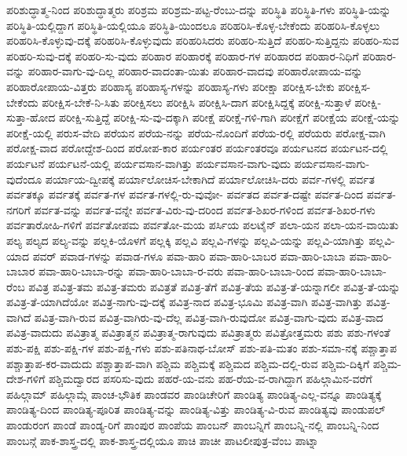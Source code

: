 {ಪರಿಶುದ್ಧಾತ್ಮ-ನಿಂದ
ಪರಿಶುದ್ಧಾತ್ಮರು
ಪರಿಶ್ರಮ
ಪರಿಶ್ರಮ-ಪಟ್ಟ-ರೆಂಬು-ದನ್ನು
ಪರಿಸ್ಥಿತಿ
ಪರಿಸ್ಥಿತಿ-ಗಳು
ಪರಿಸ್ಥಿತಿ-ಯನ್ನು
ಪರಿಸ್ಥಿತಿ-ಯಲ್ಲಿದ್ದಾಗ
ಪರಿಸ್ಥಿತಿ-ಯಲ್ಲಿಯೂ
ಪರಿಸ್ಥಿತಿ-ಯಿಂದಲೂ
ಪರಿಹರಿಸಿ-ಕೊಳ್ಳ-ಬೇಕೆಂದು
ಪರಿಹರಿಸಿ-ಕೊಳ್ಳಲು
ಪರಿಹರಿಸಿ-ಕೊಳ್ಳುವು-ದಕ್ಕೆ
ಪರಿಹರಿಸಿ-ಕೊಳ್ಳುವುದು
ಪರಿಹರಿಸಿದರು
ಪರಿಹರಿ-ಸುತ್ತಿದೆ
ಪರಿಹರಿ-ಸುತ್ತಿದ್ದನು
ಪರಿಹರಿ-ಸುವ
ಪರಿಹರಿ-ಸುವು-ದಕ್ಕೆ
ಪರಿಹರಿ-ಸು-ವುದು
ಪರಿಹಾರ
ಪರಿಹಾರಕ್ಕೆ
ಪರಿಹಾರ-ಗಳ
ಪರಿಹಾರದ
ಪರಿಹಾರ-ನಿಧಿಗೆ
ಪರಿಹಾರ-ವನ್ನು
ಪರಿಹಾರ-ವಾಗು-ವು-ದಿಲ್ಲ
ಪರಿಹಾರ-ವಾದಂತಾ-ಯಿತು
ಪರಿಹಾರ-ವಾದವು
ಪರಿಹಾರೋಪಾಯ-ವನ್ನು
ಪರಿಹಾರೋಪಾಯ-ವಿತ್ತರು
ಪರಿಹಾಸ್ಯ
ಪರಿಹಾಸ್ಯ-ಗಳನ್ನು
ಪರಿಹಾಸ್ಯ-ಗಳು
ಪರೀಕ್ಷಾ
ಪರೀಕ್ಷಿಸ-ಬೇಕು
ಪರೀಕ್ಷಿಸ-ಬೇಕೆಂದು
ಪರೀಕ್ಷಿಸ-ಬೇಕೆ-ನಿ-ಸಿತು
ಪರೀಕ್ಷಿಸಲು
ಪರೀಕ್ಷಿಸಿ
ಪರೀಕ್ಷಿಸಿ-ದಾಗ
ಪರೀಕ್ಷಿಸಿದ್ದಕ್ಕೆ
ಪರೀಕ್ಷಿ-ಸುತ್ತಾಳೆ
ಪರೀಕ್ಷಿ-ಸುತ್ತಾ-ಹೋದ
ಪರೀಕ್ಷಿ-ಸುತ್ತಿದ್ದೆ
ಪರೀಕ್ಷಿ-ಸು-ವು-ದಕ್ಕಾಗಿ
ಪರೀಕ್ಷೆ
ಪರೀಕ್ಷೆ-ಗಳಿ-ಗಾಗಿ
ಪರೀಕ್ಷೆಗೆ
ಪರೀಕ್ಷೆಯ
ಪರೀಕ್ಷೆ-ಯನ್ನು
ಪರೀಕ್ಷೆ-ಯಲ್ಲಿ
ಪರುಸ-ವೇದಿ
ಪರೆಯನ
ಪರೆಯ-ನನ್ನು
ಪರೆಯ-ನೊಂದಿಗೆ
ಪರೆಯ-ರಲ್ಲಿ
ಪರೆಯರು
ಪರೋಕ್ಷ-ವಾಗಿ
ಪರೋಕ್ಷ-ವಾದ
ಪರೋದ್ದೇಶ-ದಿಂದ
ಪರೋಪ-ಕಾರ
ಪರ್ಯಂತರ
ಪರ್ಯಂತರವೂ
ಪರ್ಯಟನದ
ಪರ್ಯಟನ-ದಲ್ಲಿ
ಪರ್ಯಟನೆ
ಪರ್ಯಟನೆ-ಯಲ್ಲಿ
ಪರ್ಯವಸಾನ-ವಾಗಿತ್ತು
ಪರ್ಯವಸಾನ-ವಾಗು-ವುದು
ಪರ್ಯವಸಾನ-ವಾಗು-ವುದೆಂದೂ
ಪರ್ಯಾಯ-ದ್ವೀಪಕ್ಕೆ
ಪರ್ಯಾಲೋಚಿಸ-ಬೇಕಾಗಿದೆ
ಪರ್ಯಾಲೋಚಿಸಿ-ದರು
ಪರ್ವ-ಗಳಲ್ಲಿ
ಪರ್ವತ
ಪರ್ವತಕ್ಕೂ
ಪರ್ವತಕ್ಕೆ
ಪರ್ವತ-ಗಳ
ಪರ್ವತ-ಗಳಲ್ಲಿ-ರು-ವುವೋ-
ಪರ್ವತದ
ಪರ್ವತ-ದಷ್ಟೇ
ಪರ್ವತ-ದಿಂದ
ಪರ್ವತ-ನಗರಿಗೆ
ಪರ್ವತ-ವನ್ನು
ಪರ್ವತ-ವನ್ನೇ
ಪರ್ವತ-ವಿರು-ವು-ದರಿಂದ
ಪರ್ವತ-ಶಿಖರ-ಗಳಿಂದ
ಪರ್ವತ-ಶಿಖರ-ಗಳು
ಪರ್ವತಾರೋಹಿ-ಗಳಿಗೆ
ಪರ್ವತೋಪಮ
ಪರ್ವತೋ-ಮಯ
ಪರ್ಸಿಯ
ಪಲಟೈನ್
ಪಲಾ-ಯನ
ಪಲಾ-ಯನ-ವಾಯಿತು
ಪಲ್ಯ
ಪಲ್ಯದ
ಪಲ್ಯ-ವನ್ನು
ಪಲ್ಲಕಿ-ಯೊಳಗೆ
ಪಲ್ಲಕ್ಕಿ
ಪಲ್ಲವಿ
ಪಲ್ಲವಿ-ಗಳನ್ನು
ಪಲ್ಲವಿ-ಯನ್ನು
ಪಲ್ಲವಿ-ಯಾಗಿತ್ತು
ಪಲ್ಲವಿ-ಯಾದ
ಪವರ್
ಪವಾಡ-ಗಳನ್ನು
ಪವಾಡ-ಗಳೂ
ಪವಾ-ಹಾರಿ
ಪವಾ-ಹಾರಿ-ಬಾಬರ
ಪವಾ-ಹಾರಿ-ಬಾಬಾ
ಪವಾ-ಹಾರಿ-ಬಾಬಾರ
ಪವಾ-ಹಾರಿ-ಬಾಬಾ-ರನ್ನು
ಪವಾ-ಹಾರಿ-ಬಾಬಾ-ರ-ವರು
ಪವಾ-ಹಾರಿ-ಬಾಬಾ-ರಿಂದ
ಪವಾ-ಹಾರಿ-ಬಾಬಾ-ರೆಂಬ
ಪವಿತ್ರ
ಪವಿತ್ರ-ತಮ
ಪವಿತ್ರ-ತಮರು
ಪವಿತ್ರತೆ
ಪವಿತ್ರ-ತೆಗೆ
ಪವಿತ್ರ-ತೆಯ
ಪವಿತ್ರ-ತೆ-ಯನ್ನಾಗಲೀ
ಪವಿತ್ರ-ತೆ-ಯನ್ನು
ಪವಿತ್ರ-ತೆ-ಯಾಗಿದೆಯೋ
ಪವಿತ್ರ-ನಾಗು-ವು-ದಕ್ಕೆ
ಪವಿತ್ರ-ನಾದ
ಪವಿತ್ರ-ಭೂಮಿ
ಪವಿತ್ರ-ವಾಗಿ
ಪವಿತ್ರ-ವಾಗಿತ್ತು
ಪವಿತ್ರ-ವಾಗಿದೆ
ಪವಿತ್ರ-ವಾಗಿ-ರುವ
ಪವಿತ್ರ-ವಾಗಿರು-ವು-ದೆಲ್ಲ
ಪವಿತ್ರ-ವಾಗಿ-ರುವುದೋ
ಪವಿತ್ರ-ವಾಗು-ವುದು
ಪವಿತ್ರ-ವಾದ
ಪವಿತ್ರ-ವಾದುದು
ಪವಿತ್ರಾತ್ಮ
ಪವಿತ್ರಾತ್ಮನ
ಪವಿತ್ರಾತ್ಮ-ರಾಗುವುದು
ಪವಿತ್ರಾತ್ಮರು
ಪವಿತ್ರೋತ್ತಮರು
ಪಶು
ಪಶು-ಗಳಂತೆ
ಪಶು-ಪಕ್ಷಿ
ಪಶು-ಪಕ್ಷಿ-ಗಳ
ಪಶು-ಪಕ್ಷಿ-ಗಳು
ಪಶು-ಪತಿನಾಥ-ಬೋಸ್
ಪಶು-ಪತಿ-ಮತಂ
ಪಶು-ಸಮಾ-ನಕ್ಕೆ
ಪಶ್ಚಾತ್ತಾಪ
ಪಶ್ಚಾತ್ತಾಪ-ಕರ-ವಾದುದು
ಪಶ್ಚಾತ್ತಾಪ-ವಾಗಿ
ಪಶ್ಚಿಮ
ಪಶ್ಚಿಮಕ್ಕೆ
ಪಶ್ಚಿಮದ
ಪಶ್ಚಿಮ-ದಲ್ಲಿ-ರುವ
ಪಶ್ಚಿಮ-ದಿಕ್ಕಿಗೆ
ಪಶ್ಚಿಮ-ದೇಶ-ಗಳಿಗೆ
ಪಶ್ಚಿಮದ್ವಾರದ
ಪಸರಿಸು-ವುದು
ಪಹರೆ-ಯ-ವನು
ಪಹ-ರೆಯ-ವ-ರಾಗಿದ್ದಾಗ
ಪಹಿಲ್ಗಾಮಿನ-ವರೆಗೆ
ಪಹಿಲ್ಗಾಮ್
ಪಹಿಲ್ಗಾಮ್ಗೆ
ಪಾಂಚ-ಭೌತಿಕ
ಪಾಂಡವರ
ಪಾಂಡಿಚೇರಿಗೆ
ಪಾಂಡಿತ್ಯ
ಪಾಂಡಿತ್ಯ-ಎಲ್ಲ-ವನ್ನೂ
ಪಾಂಡಿತ್ಯಕ್ಕೆ
ಪಾಂಡಿತ್ಯ-ದಿಂದ
ಪಾಂಡಿತ್ಯ-ಪೂರಿತ
ಪಾಂಡಿತ್ಯ-ವನ್ನು
ಪಾಂಡಿತ್ಯ-ವಿತ್ತು
ಪಾಂಡಿತ್ಯ-ವಿ-ರುವ
ಪಾಂಡಿತ್ಯವು
ಪಾಂಡುಪಲ್
ಪಾಂಡುರಂಗ
ಪಾಂಡೆ
ಪಾಂಡ್ಯ-ರಿಗೆ
ಪಾಂಪುರ
ಪಾಂಪೆಯ
ಪಾಂಬನ್
ಪಾಂಬನ್ನಿಗೆ
ಪಾಂಬನ್ನಿ-ನಲ್ಲಿ
ಪಾಂಬನ್ನಿ-ನಿಂದ
ಪಾಂಬನ್ಗೆ
ಪಾಕ-ಶಾಸ್ತ್ರ-ದಲ್ಲಿ
ಪಾಕ-ಶಾಸ್ತ್ರ-ದಲ್ಲಿಯೂ
ಪಾಚಿ
ಪಾಚೀ
ಪಾಟಲೀಪುತ್ರ-ವೆಂಬ
ಪಾಟ್ನಾ
}
